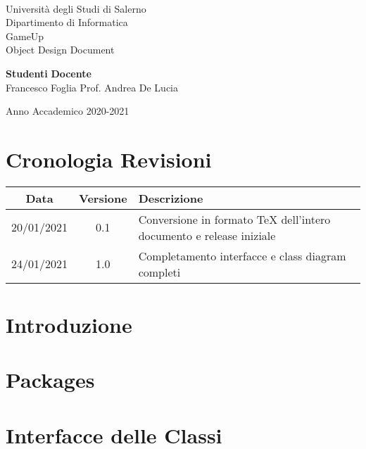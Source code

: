 \documentclass[11pt,oneside]{book}
\begin{document}

\begin{titlepage}
\begin{center}
\\[0.2truecm]
{\Large Universit\`a degli Studi di Salerno}\\[0.2truecm]
{\large Dipartimento di Informatica}\\
\hrulefill
\vfill
{\Large GameUp }\\[0.2truecm]
\vfill\vfill
{\Huge Object Design Document}
\vfill\vfill


{\bf Studenti} \hfill {\bf Docente}\ \ \\
Francesco Foglia \hfill Prof. Andrea De Lucia\\

\vfill
\hrulefill 

Anno Accademico 2020-2021

\end{center}
\end{titlepage}

\chapter*{Cronologia Revisioni}
\begin{center}
	\begin{tabular}{||c c p{10cm}||} 
	\hline
	Data & Versione & Descrizione \\ [0.5ex] 
	\hline\hline
	20/01/2021 & 0.1 & Conversione in formato TeX dell'intero documento e release iniziale \\
	\hline
	24/01/2021 & 1.0 & Completamento interfacce e class diagram completi\\
	\hline
   \end{tabular}
\end{center}

\tableofcontents
\pagestyle{plain}

\chapter{Introduzione}
\setcounter{page}{1} 	%


\chapter{Packages}


\chapter{Interfacce delle Classi}


\end{document}

